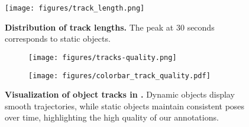 \begin{figure}
    \centering
    \texttt{[image: figures/track\_length.png]}
    \caption{\small \textbf{Distribution of track lengths.} The peak at 30 seconds corresponds to static objects.}
    \label{fig:track-length}

    \vspace{-16px}
\end{figure}

\begin{figure}
    \centering
    
    \begin{subfigure}{\linewidth}
        \centering
        \texttt{[image: figures/tracks-quality.png]}
    \end{subfigure}

    \begin{subfigure}{\linewidth}
        \centering
        \texttt{[image: figures/colorbar\_track\_quality.pdf]}
    \end{subfigure}
    \caption{\small \textbf{Visualization of object tracks in \ours.} Dynamic objects display smooth trajectories, while static objects maintain consistent poses over time, highlighting the high quality of our annotations.}
    \label{fig:tracks-quality}

    \vspace{-10px}
\end{figure}


